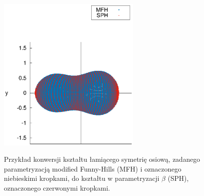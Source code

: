 \documentclass[a4paper,polish]{article}
\numberwithin{equation}{section}
\begin{document}
\begin{figure}[ht!]
    \includegraphics[width=7cm]{rys4.eps}\\
    \vspace{0.5cm}    
	\caption{Przykład konwersji kształtu łamiącego symetrię osiową, zadanego parametryzacją modified Funny-Hills (MFH) i oznaczonego niebieskimi kropkami, do kształtu w parametryzacji $\beta$ (SPH), oznaczonego czerwonymi kropkami.}
    \label{fig:example3}%
\end{figure}
\vspace*{\fill}
\end{document}
